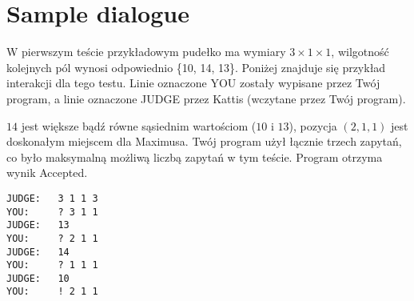 \section*{Sample dialogue}
W pierwszym teście przykładowym pudełko ma wymiary $3\times 1\times 1$, wilgotność kolejnych pól wynosi odpowiednio \{10, 14, 13\}.
Poniżej znajduje się przykład interakcji dla tego testu. Linie oznaczone YOU zostały wypisane przez Twój program,
a linie oznaczone JUDGE przez Kattis (wczytane przez Twój program).

$14$ jest większe bądź równe sąsiednim wartościom ($10$ i $13$), pozycja $(2,1,1)$ jest doskonałym miejscem dla Maximusa.
Twój program użył łącznie trzech zapytań, co było maksymalną możliwą liczbą zapytań w tym teście.
Program otrzyma wynik Accepted.

\begin{verbatim}
JUDGE:   3 1 1 3
YOU:     ? 3 1 1
JUDGE:   13
YOU:     ? 2 1 1
JUDGE:   14
YOU:     ? 1 1 1
JUDGE:   10
YOU:     ! 2 1 1
\end{verbatim}
